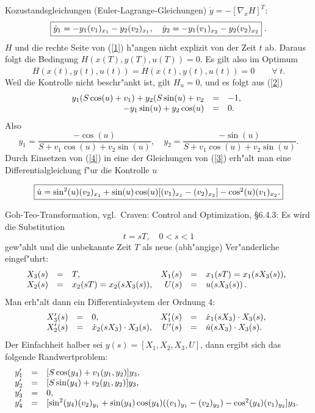 \documentclass[12pt,a4paper,twoside,leqno]{article}
\begin{document}
Kozustandsgleichungen ({\sc Euler-Lagrange}-Gleichungen)
$\dot{y} =  - [\nabla_x H]^T$:
\begin{equation} \label{3}
\fbox{$
\dot{y}_1 = -y_1(v_1)_{x_1} - y_2(v_2)_{x_1}, \quad
\dot{y}_2 = -y_1(v_1)_{x_2} - y_2(v_2)_{x_2}
$}\; .
\end{equation}
$H$ und die rechte Seite von (\ref{1}) h"angen  nicht explizit von der Zeit $t$
ab. Daraus folgt die Bedingung $H(x(T),y(T),u(T)) = 0$. Es gilt also
im Optimum
\[
H(x(t),y(t),u(t)) = \dot{H}(x(t),y(t),u(t)) = 0 \qquad \forall
\; t.
\]
Weil die Kontrolle nicht beschr"ankt ist, gilt $H_u = 0$, und es folgt
aus (\ref{2})
\[
\ba{.}{rcl}
y_1(S \cos(u) + v_1) + y_2(S \sin(u) + v_2 &=& - 1,\\
- y_1 \sin(u)  + y_2 \cos(u)              &=& 0.
\ea{.}
\]
Also
\begin{equation} \label{4}
y_1 = \frac{- \cos(u)}{S + v_1 \cos(u) + v_2 \sin(u)}, \quad
y_2 = \frac{- \sin(u)}{S + v_1 \cos(u) + v_2 \sin(u)}.
\end{equation}
Durch Einsetzen von (\ref{4}) in eine der Gleichungen von (\ref{3})
erh"alt man eine Differentialgleichung f"ur die Kontrolle $u$
\par
\begin{equation} \label{5}
\fbox{$
\dot{u} = \sin^2(u)(v_2)_{x_1} + \sin(u) \cos(u)[(v_1)_{x_1} - (v_2)_{x_2}]
- \cos^2(u)(v_1)_{x_2}.
$}
\end{equation}
\par
{\sc Goh-Teo}-Transformation, vgl.\ {\sc Craven}: Control and Optimization,
\S 6.4.3: Es wird die Substitution
\[
t = sT, \quad 0 < s < 1
\]
gew"ahlt und die unbekannte Zeit $T$ als neue (abh"angige) Ver"anderliche
eingef"uhrt:
\[
\ba{.}{rclrcl}
X_3(s) &=& T, &
X_1(s) &=& x_1(sT) = x_1(sX_3(s)), \\
X_2(s) &=& x_2(sT) = x_2(sX_3(s)), &
U(s) &=& u(sX_3(s))\,.
\ea{.}
\]
Man erh"alt dann ein Differentialsystem der Ordnung 4:
\[
\ba{.}{rclrcl}
X_3'(s) &=& 0, &
X_1'(s) &=& \dot{x}_1(sX_3)\cdot X_3(s), \\
X_2'(s) &=& \dot{x}_2(sX_3)\cdot X_3(s), &
U'(s) &=& \dot{u}(sX_3)\cdot X_3(s).
\ea{.}
\]
Der Einfachheit halber sei $y(s) = [X_1,X_2,X_3,U]$, dann ergibt sich das
folgende Randwertproblem:
\[
\ba{.}{rcl}
y'_1 &=& [S \cos(y_4) + v_1(y_1,y_2)]y_3,\\
y'_2 &=& [S \sin(y_4) + v_2(y_1,y_2)]y_3,\\
y'_3 &=& 0,\\
y'_4 &=& [\sin^2(y_4)(v_2)_{y_1} + \sin(y_4)\cos(y_4)
((v_1)_{y_1} - (v_2)_{y_2})
- \cos^2(y_4)(v_1)_{y_2}]y_3.
\ea{.}
\]
\end{document}
